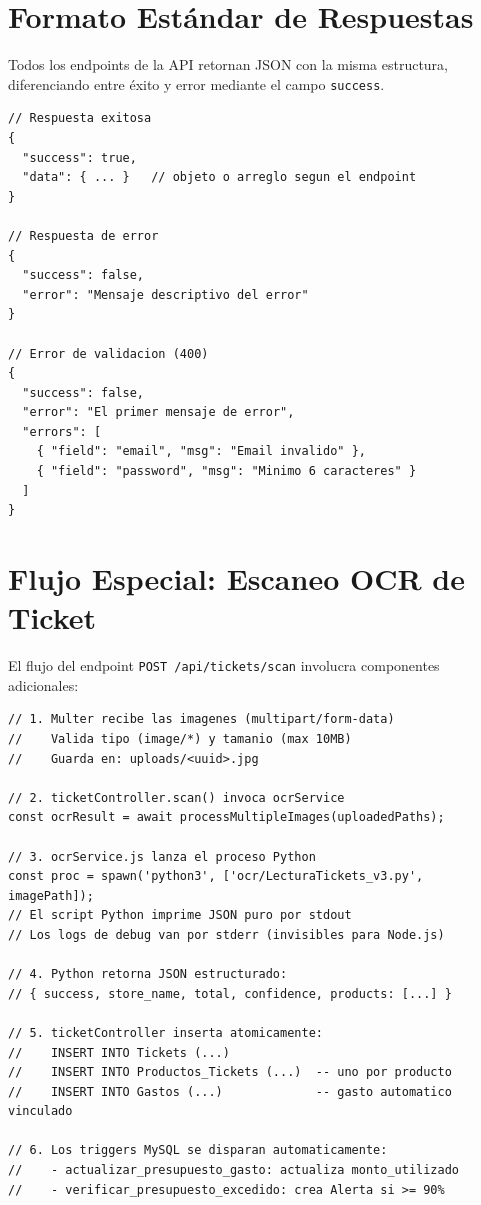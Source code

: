 \section{Formato Estándar de Respuestas}

Todos los endpoints de la API retornan JSON con la misma estructura, diferenciando entre éxito y error mediante el campo \texttt{success}.

\begin{lstlisting}[style=json, caption={Formatos de respuesta estándar de la API}, label={lst:response-format}]
// Respuesta exitosa
{
  "success": true,
  "data": { ... }   // objeto o arreglo segun el endpoint
}

// Respuesta de error
{
  "success": false,
  "error": "Mensaje descriptivo del error"
}

// Error de validacion (400)
{
  "success": false,
  "error": "El primer mensaje de error",
  "errors": [
    { "field": "email", "msg": "Email invalido" },
    { "field": "password", "msg": "Minimo 6 caracteres" }
  ]
}
\end{lstlisting}

\section{Flujo Especial: Escaneo OCR de Ticket}

El flujo del endpoint \texttt{POST /api/tickets/scan} involucra componentes adicionales:

\begin{lstlisting}[style=javascript, caption={Flujo completo de escaneo de ticket con OCR}, label={lst:ocr-flow}]
// 1. Multer recibe las imagenes (multipart/form-data)
//    Valida tipo (image/*) y tamanio (max 10MB)
//    Guarda en: uploads/<uuid>.jpg

// 2. ticketController.scan() invoca ocrService
const ocrResult = await processMultipleImages(uploadedPaths);

// 3. ocrService.js lanza el proceso Python
const proc = spawn('python3', ['ocr/LecturaTickets_v3.py', imagePath]);
// El script Python imprime JSON puro por stdout
// Los logs de debug van por stderr (invisibles para Node.js)

// 4. Python retorna JSON estructurado:
// { success, store_name, total, confidence, products: [...] }

// 5. ticketController inserta atomicamente:
//    INSERT INTO Tickets (...)
//    INSERT INTO Productos_Tickets (...)  -- uno por producto
//    INSERT INTO Gastos (...)             -- gasto automatico vinculado

// 6. Los triggers MySQL se disparan automaticamente:
//    - actualizar_presupuesto_gasto: actualiza monto_utilizado
//    - verificar_presupuesto_excedido: crea Alerta si >= 90%
\end{lstlisting}
